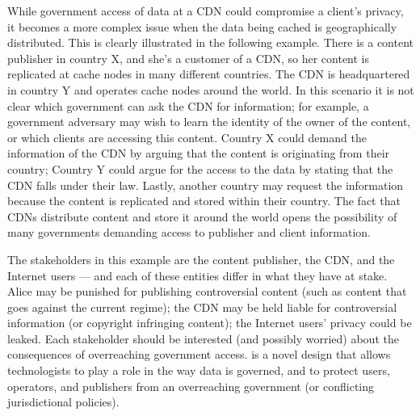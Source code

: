 While government access of data at a CDN could compromise a client's privacy, it becomes a more complex issue when the data being cached is geographically 
distributed. This is clearly illustrated in the following example.  There is a content publisher in 
country X, and she's a customer of a CDN, so her content is replicated at cache nodes in many 
different countries.  The CDN is headquartered 
in country Y and operates cache nodes around the world.  In this scenario it is not clear which government can ask the CDN for information; for 
example, a government adversary may wish to learn the identity of the owner of the content, or which clients are accessing 
this content.  Country X could demand the information of the CDN by arguing that the content is originating 
from their country; Country Y could argue for the access to the data by stating that the CDN falls under their 
law.  Lastly, another country may request the information because the content is replicated and stored within 
their country.  The fact that CDNs distribute content and store it around the world opens the possibility of 
many governments demanding access to publisher and client information.

The stakeholders in this 
example are the content publisher, the CDN, and the Internet users --- and each of these entities differ in what 
they have at stake.  Alice may be punished for publishing controversial content (such as content that 
goes against the current regime); the CDN 
may be held liable for controversial information (or copyright infringing content); the Internet users' 
privacy could be leaked.  Each stakeholder should be interested (and possibly worried) about the 
consequences of overreaching government access.  \system{} is a novel design that allows technologists to play 
a role in the way data is governed, and to protect users, operators, and publishers from an overreaching government (or 
conflicting jurisdictional policies).
